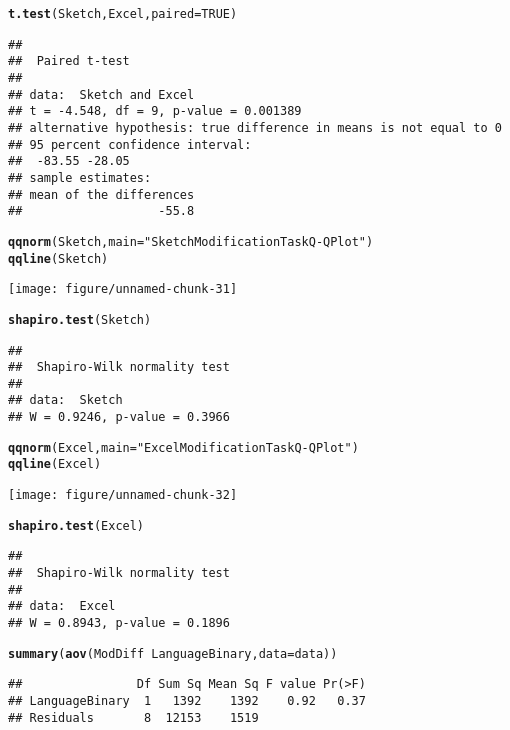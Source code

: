 \documentclass[12pt, twoside, a4paper, openright]{report}\usepackage[]{graphicx}\usepackage[]{color}
\makeatletter
\def\maxwidth{ %
  \ifdim\Gin@nat@width>\linewidth
    \linewidth
  \else
    \Gin@nat@width
  \fi
}
\newcommand{\hlnum}[1]{\textcolor[rgb]{0.686,0.059,0.569}{#1}}%
\newcommand{\hlstr}[1]{\textcolor[rgb]{0.192,0.494,0.8}{#1}}%
\newcommand{\hlopt}[1]{\textcolor[rgb]{0,0,0}{#1}}%
\newcommand{\hlstd}[1]{\textcolor[rgb]{0.345,0.345,0.345}{#1}}%
\newcommand{\hlkwc}[1]{\textcolor[rgb]{0.333,0.667,0.333}{#1}}%
\newcommand{\hlkwd}[1]{\textcolor[rgb]{0.737,0.353,0.396}{\textbf{#1}}}%
\newenvironment{kframe}{%
 \def\at@end@of@kframe{}%
 \ifinner\ifhmode%
  \def\at@end@of@kframe{\end{minipage}}%
  \begin{minipage}{\columnwidth}%
 \fi\fi%
 \def\FrameCommand##1{\hskip\@totalleftmargin \hskip-\fboxsep
 \colorbox{shadecolor}{##1}\hskip-\fboxsep
     \hskip-\linewidth \hskip-\@totalleftmargin \hskip\columnwidth}%
 \MakeFramed {\advance\hsize-\width
   \@totalleftmargin\z@ \linewidth\hsize
   \@setminipage}}%
 {\par\unskip\endMakeFramed%
 \at@end@of@kframe}
\newenvironment{knitrout}{}{} %
\makeatother
\begin{document}
\begin{knitrout}
\color{fgcolor}\begin{kframe}
\begin{alltt}
\hlkwd{t.test}\hlstd{(Sketch, Excel,} \hlkwc{paired} \hlstd{=} \hlnum{TRUE}\hlstd{)}
\end{alltt}
\begin{verbatim}
## 
## 	Paired t-test
## 
## data:  Sketch and Excel
## t = -4.548, df = 9, p-value = 0.001389
## alternative hypothesis: true difference in means is not equal to 0
## 95 percent confidence interval:
##  -83.55 -28.05
## sample estimates:
## mean of the differences 
##                   -55.8
\end{verbatim}
\begin{alltt}
\hlkwd{qqnorm}\hlstd{(Sketch,} \hlkwc{main} \hlstd{=} \hlstr{"Sketch Modification Task Q-Q Plot"}\hlstd{)}
\hlkwd{qqline}\hlstd{(Sketch)}
\end{alltt}
\end{kframe}
\texttt{[image: figure/unnamed-chunk-31]} 
\begin{kframe}\begin{alltt}
\hlkwd{shapiro.test}\hlstd{(Sketch)}
\end{alltt}
\begin{verbatim}
## 
## 	Shapiro-Wilk normality test
## 
## data:  Sketch
## W = 0.9246, p-value = 0.3966
\end{verbatim}
\begin{alltt}
\hlkwd{qqnorm}\hlstd{(Excel,} \hlkwc{main} \hlstd{=} \hlstr{"Excel Modification Task Q-Q Plot"}\hlstd{)}
\hlkwd{qqline}\hlstd{(Excel)}
\end{alltt}
\end{kframe}
\texttt{[image: figure/unnamed-chunk-32]} 
\begin{kframe}\begin{alltt}
\hlkwd{shapiro.test}\hlstd{(Excel)}
\end{alltt}
\begin{verbatim}
## 
## 	Shapiro-Wilk normality test
## 
## data:  Excel
## W = 0.8943, p-value = 0.1896
\end{verbatim}
\begin{alltt}
\hlkwd{summary}\hlstd{(}\hlkwd{aov}\hlstd{(ModDiff} \hlopt{~} \hlstd{LanguageBinary,} \hlkwc{data} \hlstd{= data))}
\end{alltt}
\begin{verbatim}
##                Df Sum Sq Mean Sq F value Pr(>F)
## LanguageBinary  1   1392    1392    0.92   0.37
## Residuals       8  12153    1519
\end{verbatim}
\end{kframe}
\end{knitrout}
\end{document}
